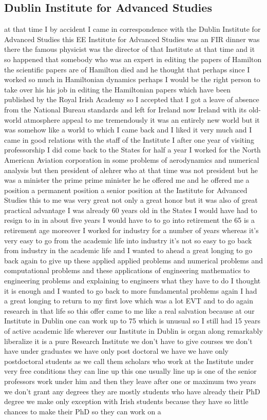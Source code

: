 \documentclass{article}
\begin{document}
\subsection{Dublin Institute for Advanced Studies}
at that time I by accident I came in correspondence with the Dublin Institute for Advanced Studies this EE Institute for Advanced Studies was an FIR dinner was there the famous physicist was the director of that Institute at that time and it so happened that somebody who was an expert in editing the papers of Hamilton the scientific papers are of Hamilton died and he thought that perhaps since I worked so much in Hamiltonian dynamics perhaps I would be the right person to take over his his job in editing the Hamiltonian papers which have been published by the Royal Irish Academy so I accepted that I got a leave of absence from the National Bureau standards and left for Ireland now Ireland with its old-world atmosphere appeal to me tremendously it was an entirely new world but it was somehow like a world to which I came back and I liked it very much and I came in good relations with the staff of the Institute I after one year of visiting professorship I did come back to the States for half a year I worked for the North American Aviation corporation in some problems of aerodynamics and numerical analysis but then president of alehrer who at that time was not president but he was a minister the prime prime minister he he offered me and he offered me a position a permanent position a senior position at the Institute for Advanced Studies this to me was very great not only a great honor but it was also of great practical advantage I was already 60 years old in the States I would have had to resign to in in about five years I would have to to go into retirement the 65 is a retirement age moreover I worked for industry for a number of years whereas it's very easy to go from the academic life into industry it's not so easy to go back from industry in the academic life and I wanted to ahead a great longing to go back again to give up these applied applied problems and numerical problems and computational problems and these applications of engineering mathematics to engineering problems and explaining to engineers what they have to do I thought it is enough and I wanted to go back to more fundamental problems again I had a great longing to return to my first love which was a lot EVT and to do again research in that life so this offer came to me like a real salvation because at our Institute in Dublin one can work up to 75 which is unusual so I still had 15 years of active academic life wherever our Institute in Dublin is organ along remarkably liberalize it is a pure Research Institute we don't have to give courses we don't have under graduates we have only post doctoral we have we have only postdoctoral students as we call them scholars who work at the Institute under very free conditions they can line up this one usually line up is one of the senior professors work under him and then they leave after one or maximum two years we don't grant any degrees they are mostly students who have already their PhD degree we make only exception with Irish students because they have so little chances to make their PhD so they can work on a 
\end{document}
